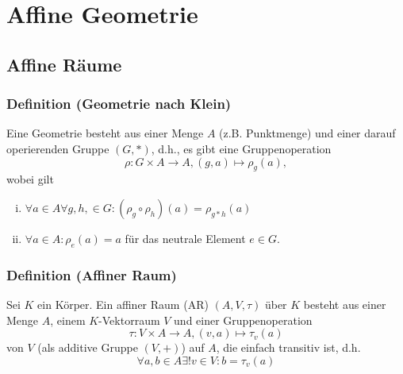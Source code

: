 \chapter{Affine Geometrie}
\section{Affine Räume}

\subsection{Definition (Geometrie nach Klein)}
\begin{Definition}[Geometrie]
	Eine Geometrie besteht aus einer Menge $ A $ (z.B. Punktmenge) und einer darauf operierenden Gruppe $ (G,*) $, d.h.,
	es gibt eine Gruppenoperation
		\[ \rho: G\times A\to A,(g,a)\mapsto \rho_g(a),  \]
	wobei gilt
		\begin{enumerate}[(i)]
			\item $ \forall a\in A\forall g,h,\in G:(\rho_g\circ \rho_h)(a) = \rho_{g*h}(a) $
			\item $ \forall a\in A:\rho_e(a) = a $ für das neutrale Element $ e \in G $.
		\end{enumerate}
\end{Definition}

\subsection{Definition (Affiner Raum)}
\begin{Definition}
	Sei $ K $ ein Körper. Ein affiner Raum (AR) $ (A,V,\tau) $ über $ K $ besteht aus einer Menge $ A $, einem $ K $-Vektorraum $ V $ und einer Gruppenoperation
		\[ \tau:V\times A\to A,(v,a)\mapsto \tau_v(a) \]
	von $ V $ (als additive Gruppe $ (V,+) $) auf $ A $, die einfach transitiv ist, d.h.
		\[ \forall a,b\in A\exists!v\in V:b=\tau_v(a) \]
\end{Definition}


